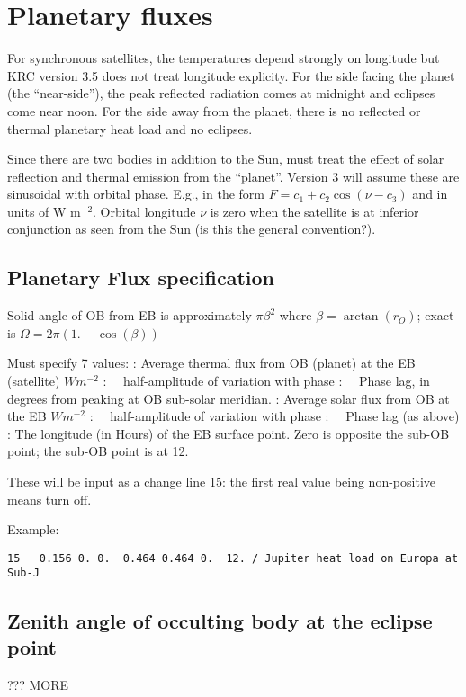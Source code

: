 \documentclass{article}
\begin{document}
\section{Planetary fluxes}

For synchronous satellites, the temperatures depend strongly on longitude but
KRC version 3.5 does not treat longitude explicity.  For the side facing the
planet (the ``near-side''), the peak reflected radiation comes at midnight and
eclipses come near noon. For the side away from the planet, there is no
reflected or thermal planetary heat load and no eclipses.

Since there are two bodies in addition to the Sun, must treat the effect of
solar reflection and thermal emission from the ``planet''.  Version 3 will
assume these are sinusoidal with orbital phase.  E.g., in the form $F=c_1 + c_2
\cos (\nu -c_3)$ and in units of W m$^{-2}$. Orbital longitude $\nu$ is zero
when the satellite is at inferior conjunction as seen from the Sun (is this the
general convention?).

\subsection{Planetary Flux specification \label{pline}}
 Solid angle of OB from EB is approximately $\pi \beta^2$ 
where $\beta = \arctan(r_O)$; exact is $\Omega=2 \pi (1.- \cos(\beta))$

Must specify 7 values:
: Average thermal flux from OB (planet) at the EB (satellite) $W m^{-2}$
: \ \ half-amplitude of variation with phase
: \  \ Phase lag, in degrees from peaking at OB sub-solar meridian. 
: Average solar flux from OB at the EB $W m^{-2}$
:  \ \ half-amplitude of variation with phase
:  \ \ Phase lag (as above)
: The longitude (in Hours) of the EB surface point.
\qiii  Zero is opposite the sub-OB point; the sub-OB point is at 12.
 
These will be input as a change line 15: the first real value being non-positive
means turn off.  

Example: \vspace{-3.mm} 
\begin{verbatim}
15   0.156 0. 0.  0.464 0.464 0.  12. / Jupiter heat load on Europa at Sub-J
\end{verbatim}

\subsection{Zenith angle of occulting body at the eclipse point}  
??? MORE
\end{document}
